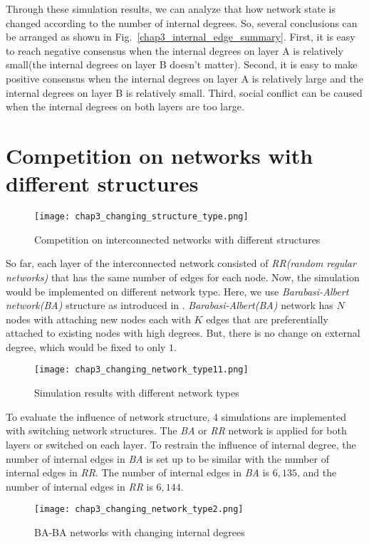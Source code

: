 Through these simulation results, we can analyze that how network state is changed according to the number of internal degrees. So, several conclusions can be arranged as shown in Fig.~\ref{chap3_internal_edge_summary}.  First, it is easy to reach negative consensus when the internal degrees on layer A is relatively small(the internal degrees on layer B doesn't matter). Second, it is easy to make positive consensus when the internal degrees on layer A is relatively large and the internal degrees on layer B is relatively small. Third, social conflict can be caused when the internal degrees on both layers are too large.  

\section{Competition on networks with different structures}
\begin{figure}[!htb]
	\centering
	\texttt{[image: chap3\_changing\_structure\_type.png]}
	\caption{Competition on interconnected networks with different structures}
	\label{chap3_changing_structure_type}
\end{figure}
So far, each layer of the interconnected network consisted of \textit{RR(random regular networks)} that has the same number of edges for each node. Now, the simulation would be implemented on different network type. Here, we use \textit{Barabasi-Albert network(BA)} structure as introduced in \parencite{barabasi1999}. \textit{Barabasi-Albert(BA)} network has $N$ nodes with attaching new nodes each with $K$ edges that are preferentially attached to existing nodes with high degrees. But, there is no change on external degree, which would be fixed to only $1$.
\begin{figure}[!htb]
	\centering
	\texttt{[image: chap3\_changing\_network\_type11.png]}
	\caption{Simulation results with different network types}
	\label{chap3_changing_network_type1}
\end{figure}
To evaluate the influence of network structure, 4 simulations are implemented with switching network structures. The \textit{BA} or \textit{RR} network is applied for both layers or switched on each layer. To restrain the influence of internal degree, the number of internal edges in \textit{BA} is set up to be similar with the number of internal edges in \textit{RR}. The number of internal edges in \textit{BA} is $6,135$, and the number of internal edges in \textit{RR} is $6,144$. 
\begin{figure}[!htb]
	\centering
	\texttt{[image: chap3\_changing\_network\_type2.png]}
	\caption{BA-BA networks with changing internal degrees}
	\label{chap3_changing_network_type2}
\end{figure}
